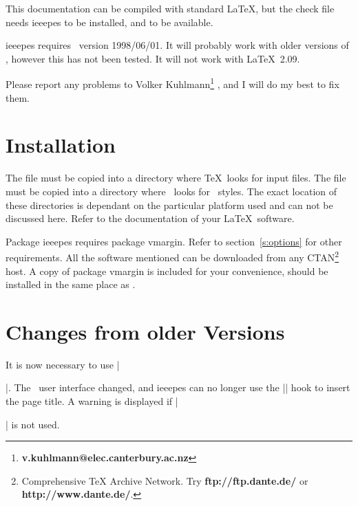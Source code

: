 \documentclass[twoside,twocolumn,a4paper]{article}
\begin{document}
This documentation can be compiled with standard \LaTeX, but the check file
needs ieeepes to be installed, and  to be available.

ieeepes requires \LaTeXe\ version 1998/06/01. It will probably work
with older versions of \LaTeXe, however this has not been tested. It
will not work with \LaTeX\ 2.09.

Please report any problems to Volker Kuhlmann\footnote
	{\textbf{v.kuhlmann@elec.canterbury.ac.nz}}%
, and I will do my best to fix them.



\section{Installation}
\label{s:installation}

The file  must be copied into a directory where \TeX\ looks
for input files. The file  must be copied into a directory
where \BibTeX\ looks for \BibTeX\ styles. The exact location of these
directories is dependant on the particular platform used and can not be
discussed here. Refer to the documentation of your \LaTeX\ software.

Package ieeepes requires package vmargin. Refer to section~\ref{s:options} for
other requirements. All the software mentioned can be downloaded from any
CTAN\footnote
	{Comprehensive TeX Archive Network.
	Try \textbf{ftp://ftp.dante.de/} or \textbf{http://www.dante.de/}.}
host. A copy of package vmargin is included for your convenience,
 should be installed in the same place as .



\section{Changes from older Versions}
\label{s:changes}

It is now necessary to use |\maketitle|. The \LaTeXe\ user interface changed,
and ieeepes can no longer use the |\AtBeginDocument| hook to insert the page
title. A warning is displayed if |\maketitle| is not used.
\end{document}
